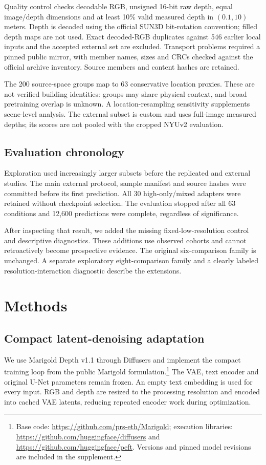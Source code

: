 \documentclass[10pt,twocolumn,letterpaper]{article}
\begin{document}
Quality control checks decodable RGB, unsigned 16-bit raw depth, equal image/depth dimensions and at least 10\% valid measured depth in $(0.1,10)$ meters. Depth is decoded using the official SUN3D bit-rotation convention; filled depth maps are not used. Exact decoded-RGB duplicates against 546 earlier local inputs and the accepted external set are excluded. Transport problems required a pinned public mirror, with member names, sizes and CRCs checked against the official archive inventory. Source members and content hashes are retained.

The 200 source-space groups map to 63 conservative location proxies. These are not verified building identities: groups may share physical context, and broad pretraining overlap is unknown. A location-resampling sensitivity supplements scene-level analysis. The external subset is custom and uses full-image measured depths; its scores are not pooled with the cropped NYUv2 evaluation.

\subsection{Evaluation chronology}
Exploration used increasingly larger subsets before the replicated and external studies. The main external protocol, sample manifest and source hashes were committed before its first prediction. All 30 high-only/mixed adapters were retained without checkpoint selection. The evaluation stopped after all 63 conditions and 12,600 predictions were complete, regardless of significance.

After inspecting that result, we added the missing fixed-low-resolution control and descriptive diagnostics. These additions use observed cohorts and cannot retroactively become prospective evidence. The original six-comparison family is unchanged. A separate exploratory eight-comparison family and a clearly labeled resolution-interaction diagnostic describe the extensions.

\section{Methods}
\subsection{Compact latent-denoising adaptation}
We use Marigold Depth v1.1 through Diffusers and implement the compact training loop from the public Marigold formulation.\footnote{Base code: \url{https://github.com/prs-eth/Marigold}; execution libraries: \url{https://github.com/huggingface/diffusers} and \url{https://github.com/huggingface/peft}. Versions and pinned model revisions are included in the supplement.} The VAE, text encoder and original U-Net parameters remain frozen. An empty text embedding is used for every input. RGB and depth are resized to the processing resolution and encoded into cached VAE latents, reducing repeated encoder work during optimization.
\end{document}
